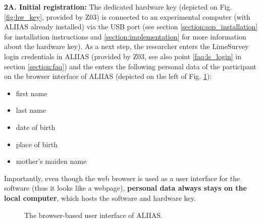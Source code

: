 \textbf{2A. Initial registration:} The dedicated hardware key (depicted on Fig. \ref{fig:hw_key}, provided by Z03) is connected to an experimental computer (with ALIIAS already installed) via the USB port (see section \ref{section:sop_installation} for installation instructions and \ref{section:implementation} for more information about the hardware key).
As a next step, the researcher enters the LimeSurvey login credentials in ALIIAS (provided by Z03, see also point \ref{faq:ls_login} in section \ref{section:faq}) and the enters the following personal data of the participant on the browser interface of ALIIAS (depicted on the left of Fig. \ref{fig:screenshots}):
\begin{itemize}
    \item first name
    \item last name
    \item date of birth
    \item place of birth
    \item mother's maiden name
\end{itemize}

Importantly, even though the web browser is used as a user interface for the software (thus it looks like a webpage), \textbf{personal data always stays on the local computer}, which hosts the software and hardware key.


\begin{figure}[H]
{}
\hfill
{}
\caption{The browser-based user interface of ALIIAS.}
\label{fig:screenshots}
\end{figure}

